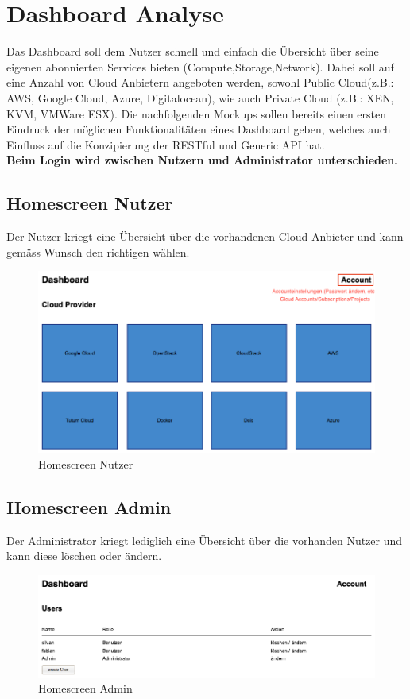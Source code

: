 \newpage
\section{Dashboard Analyse}
Das Dashboard soll dem Nutzer schnell und einfach die Übersicht über seine 
eigenen abonnierten Services bieten (Compute,Storage,Network).
Dabei soll auf eine Anzahl von Cloud Anbietern angeboten werden, sowohl Public 
Cloud(z.B.: AWS, Google Cloud, Azure, Digitalocean), wie auch Private Cloud (z.B.: XEN, KVM, VMWare ESX).
Die nachfolgenden Mockups sollen bereits einen ersten Eindruck der 
möglichen Funktionalitäten eines Dashboard geben, welches auch Einfluss auf die 
Konzipierung der RESTful und Generic API hat.
\\
\textbf{Beim Login wird zwischen Nutzern und Administrator unterschieden.}

\subsection{Homescreen Nutzer}
Der Nutzer kriegt eine Übersicht über die vorhandenen Cloud Anbieter und kann 
gemäss Wunsch den richtigen wählen.
\begin{figure}[!htbp]
\includegraphics[width=\textwidth]{./03_Analyse/03_Dashboard/images/homescreen_user}
\caption{Homescreen Nutzer}
\end{figure}

\newpage

\subsection{Homescreen Admin}

Der Administrator kriegt lediglich eine Übersicht über die vorhanden Nutzer und 
kann diese löschen oder ändern.
\begin{figure}[!htbp]
  \includegraphics[width=\textwidth]{./03_Analyse/03_Dashboard/images/homescreen_admin}
  \caption{Homescreen Admin}
\end{figure}


